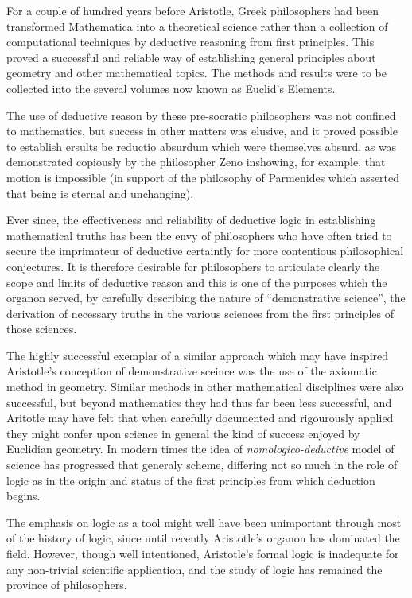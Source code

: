 For a couple of hundred years before Aristotle, Greek philosophers had been transformed Mathematica into a theoretical science rather than a collection of computational techniques by deductive reasoning from first principles.
This proved a successful and reliable way of establishing general principles about geometry and other mathematical topics.
The methods and results were to be collected into the several volumes now known as Euclid's Elements.

The use of deductive reason by these pre-socratic philosophers was not confined to mathematics, but success in other matters was elusive, and it proved possible to establish ersults be reductio absurdum which were themselves absurd, as was demonstrated copiously by the philosopher Zeno inshowing, for example, that motion is impossible (in support of the philosophy of Parmenides which asserted that being is eternal and unchanging).

Ever since, the effectiveness and reliability of deductive logic in establishing mathematical truths has been the envy of philosophers who have often tried to secure the imprimateur of deductive certaintly for more contentious philosophical conjectures.
It is therefore desirable for philosophers to articulate clearly the scope and limits of deductive reason and this is one of the purposes which the organon served, by carefully describing the nature of ``demonstrative science'', the derivation of necessary truths in the various sciences
from the first principles of those sciences.

The highly successful exemplar of a similar approach which may have inspired Aristotle's conception of demonstrative sceince was the use of the axiomatic method in geometry.
Similar methods in other mathematical disciplines were also successful, but beyond mathematics they had thus far been less successful, and Aritotle may have felt that when carefully documented and rigourously applied they might confer upon science in general the kind of success enjoyed by Euclidian geometry.  
In modern times the idea of {\it nomologico-deductive} model of science has progressed that generaly scheme, differing not so much in the role of logic as in the origin and
status of the first principles from which deduction begins.
 
The emphasis on logic as a tool might well have been unimportant
through most of the history of logic, since until recently Aristotle's
organon has dominated the field.
However, though well intentioned, Aristotle's formal logic is
inadequate for any non-trivial scientific application, and the study
of logic has remained the province of philosophers.

